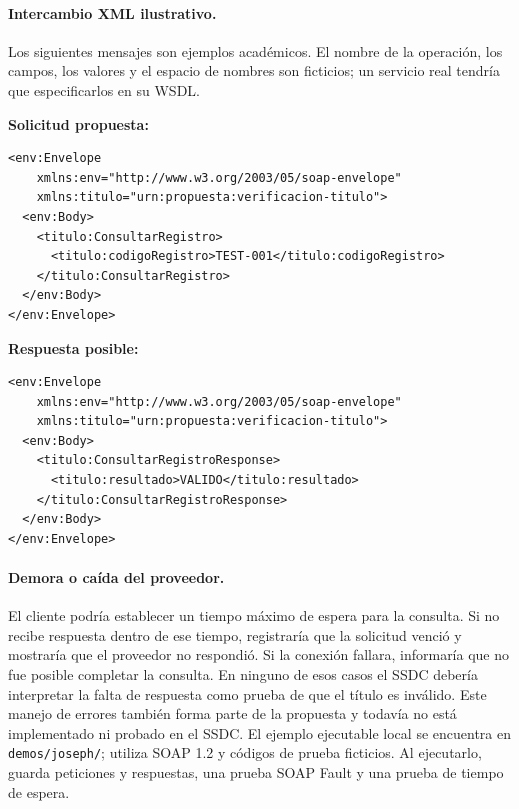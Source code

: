 \paragraph{Intercambio XML ilustrativo.}
Los siguientes mensajes son ejemplos académicos. El nombre de la operación,
los campos, los valores y el espacio de nombres son ficticios; un servicio
real tendría que especificarlos en su WSDL.

\textbf{Solicitud propuesta:}
\begin{verbatim}
<env:Envelope
    xmlns:env="http://www.w3.org/2003/05/soap-envelope"
    xmlns:titulo="urn:propuesta:verificacion-titulo">
  <env:Body>
    <titulo:ConsultarRegistro>
      <titulo:codigoRegistro>TEST-001</titulo:codigoRegistro>
    </titulo:ConsultarRegistro>
  </env:Body>
</env:Envelope>
\end{verbatim}

\textbf{Respuesta posible:}
\begin{verbatim}
<env:Envelope
    xmlns:env="http://www.w3.org/2003/05/soap-envelope"
    xmlns:titulo="urn:propuesta:verificacion-titulo">
  <env:Body>
    <titulo:ConsultarRegistroResponse>
      <titulo:resultado>VALIDO</titulo:resultado>
    </titulo:ConsultarRegistroResponse>
  </env:Body>
</env:Envelope>
\end{verbatim}

\paragraph{Demora o caída del proveedor.}
El cliente podría establecer un tiempo máximo de espera para la consulta.
Si no recibe respuesta dentro de ese tiempo, registraría que la solicitud
venció y mostraría que el proveedor no respondió. Si la conexión fallara,
informaría que no fue posible completar la consulta. En ninguno de esos
casos el SSDC debería interpretar la falta de respuesta como prueba de que
el título es inválido. Este manejo de errores también forma parte de la
propuesta y todavía no está implementado ni probado en el SSDC. El ejemplo ejecutable
local se encuentra en \texttt{demos/joseph/}; utiliza SOAP 1.2 y códigos
de prueba ficticios. Al ejecutarlo, guarda peticiones y respuestas,
una prueba SOAP Fault y una prueba de tiempo de espera.

